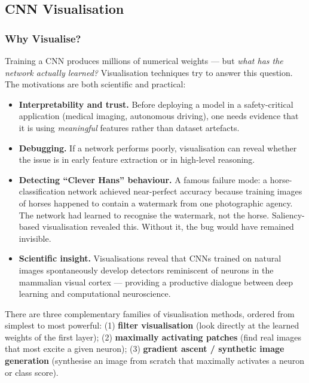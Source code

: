 \documentclass[11pt,a4paper]{article}
\begin{document}
\subsection{CNN Visualisation}
\label{sec:cnn_viz}

\subsubsection{Why Visualise?}

Training a CNN produces millions of numerical weights — but \emph{what has the network actually learned?}
Visualisation techniques try to answer this question. The motivations are both scientific and practical:

\begin{itemize}
  \item \textbf{Interpretability and trust.} Before deploying a model in a safety-critical application (medical imaging, autonomous driving), one needs evidence that it is using \emph{meaningful} features rather than dataset artefacts.
  \item \textbf{Debugging.} If a network performs poorly, visualisation can reveal whether the issue is in early feature extraction or in high-level reasoning.
  \item \textbf{Detecting ``Clever Hans'' behaviour.} A famous failure mode: a horse-classification network achieved near-perfect accuracy because training images of horses happened to contain a watermark from one photographic agency. The network had learned to recognise the watermark, not the horse. Saliency-based visualisation revealed this. Without it, the bug would have remained invisible.
  \item \textbf{Scientific insight.} Visualisations reveal that CNNs trained on natural images spontaneously develop detectors reminiscent of neurons in the mammalian visual cortex — providing a productive dialogue between deep learning and computational neuroscience.
\end{itemize}

There are three complementary families of visualisation methods, ordered from simplest to most powerful:
(1) \textbf{filter visualisation} (look directly at the learned weights of the first layer);
(2) \textbf{maximally activating patches} (find real images that most excite a given neuron);
(3) \textbf{gradient ascent / synthetic image generation} (synthesise an image from scratch that maximally activates a neuron or class score).
\end{document}
